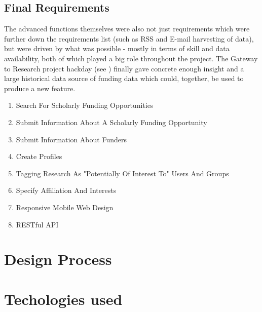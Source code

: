 \subsection{Final Requirements}
\label{final-reqs}

The advanced functions themselves were also not just requirements which were further down the requirements list (such as RSS and E-mail harvesting of data), but were driven by what was possible - mostly in terms of skill and data availability, both of which played a big role throughout the project. The Gateway to Research project hackday (see ) finally gave concrete enough insight and a large historical data source of funding data which could, together, be used to produce a new feature.

\begin{enumerate}
\item Search For Scholarly Funding Opportunities
\item Submit Information About A Scholarly Funding Opportunity
\item Submit Information About Funders
\item Create Profiles
\item Tagging Research As "Potentially Of Interest To" Users And Groups
\item Specify Affiliation And Interests
\item Responsive Mobile Web Design
\item RESTful API
\end{enumerate}




\section{Design Process}


\section{Techologies used}

